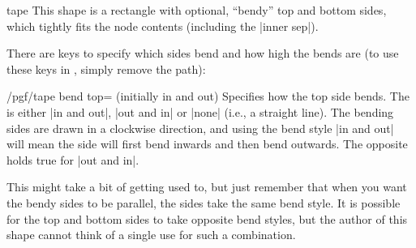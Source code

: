 \begin{shape}{tape}
    This shape is a rectangle with optional, ``bendy'' top and bottom sides,
    which tightly fits the node contents (including the |inner sep|).
\begin{codeexample}[preamble={\usetikzlibrary{shapes.symbols}}]
\end{codeexample}

    There are \pgfname{} keys to specify which sides bend and how high the
    bends are (to use these keys in \tikzname{}, simply remove the
     path):

    \begin{key}{/pgf/tape bend top= (initially in and out)}
        Specifies how the top side bends. The  is either
        |in and out|, |out and in| or |none| (i.e., a straight line). The
        bending sides are drawn in a clockwise direction, and using the bend
        style |in and out| will mean the side will first bend inwards and then
        bend outwards. The opposite holds true for |out and in|.
\begin{codeexample}[preamble={\usetikzlibrary{shapes.symbols}}]
\end{codeexample}

        This might take a bit of getting used to, but just remember that when
        you want the bendy sides to be parallel, the sides take the same bend
        style. It is possible for the top and bottom sides to take opposite
        bend styles, but the author of this shape cannot think of a single use
        for such a combination.
\begin{codeexample}[preamble={\usetikzlibrary{shapes.symbols}}]
\end{codeexample}
    \end{key}


\end{shape}
